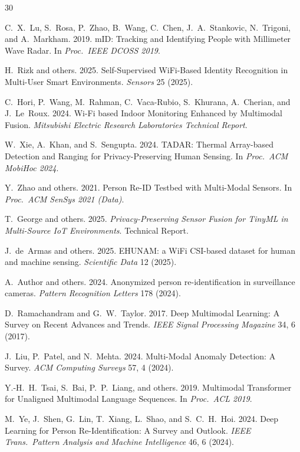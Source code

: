 \documentclass[sigconf,nonacm]{acmart}
\begin{document}
\sloppy

\begin{thebibliography}{30}

C.~X.~Lu, S.~Rosa, P.~Zhao, B.~Wang, C.~Chen, J.~A.~Stankovic,
N.~Trigoni, and A.~Markham. 2019. mID: Tracking and Identifying
People with Millimeter Wave Radar.
In \textit{Proc.\ IEEE DCOSS 2019}.

H.~Rizk and others. 2025. Self-Supervised WiFi-Based Identity
Recognition in Multi-User Smart Environments.
\textit{Sensors} 25 (2025).

C.~Hori, P.~Wang, M.~Rahman, C.~Vaca-Rubio, S.~Khurana,
A.~Cherian, and J.~Le~Roux. 2024. Wi-Fi based Indoor Monitoring
Enhanced by Multimodal Fusion.
\textit{Mitsubishi Electric Research Laboratories Technical
Report}.

W.~Xie, A.~Khan, and S.~Sengupta. 2024. TADAR: Thermal Array-based
Detection and Ranging for Privacy-Preserving Human Sensing.
In \textit{Proc.\ ACM MobiHoc 2024}.

Y.~Zhao and others. 2021. Person Re-ID Testbed with Multi-Modal
Sensors. In \textit{Proc.\ ACM SenSys 2021 (Data)}.

T.~George and others. 2025. \textit{Privacy-Preserving Sensor
Fusion for TinyML in Multi-Source IoT Environments}.
Technical Report.

J.~de~Armas and others. 2025. EHUNAM: a WiFi CSI-based dataset
for human and machine sensing.
\textit{Scientific Data} 12 (2025).

A.~Author and others. 2024. Anonymized person re-identification
in surveillance cameras.
\textit{Pattern Recognition Letters} 178 (2024).

D.~Ramachandram and G.~W.~Taylor. 2017. Deep Multimodal Learning:
A Survey on Recent Advances and Trends.
\textit{IEEE Signal Processing Magazine} 34, 6 (2017).

J.~Liu, P.~Patel, and N.~Mehta. 2024. Multi-Modal Anomaly
Detection: A Survey.
\textit{ACM Computing Surveys} 57, 4 (2024).

Y.-H.~H.~Tsai, S.~Bai, P.~P.~Liang, and others. 2019. Multimodal
Transformer for Unaligned Multimodal Language Sequences.
In \textit{Proc.\ ACL 2019}.

M.~Ye, J.~Shen, G.~Lin, T.~Xiang, L.~Shao, and S.~C.~H.~Hoi. 2024.
Deep Learning for Person Re-Identification: A Survey and Outlook.
\textit{IEEE Trans.\ Pattern Analysis and Machine Intelligence}
46, 6 (2024).


\end{thebibliography}
\end{document}
